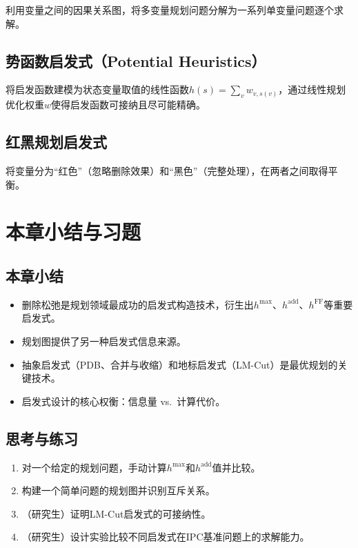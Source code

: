 利用变量之间的因果关系图，将多变量规划问题分解为一系列单变量问题逐个求解。

\subsection{势函数启发式（Potential Heuristics）}

将启发函数建模为状态变量取值的线性函数$h(s) = \sum_v w_{v,s(v)}$，通过线性规划优化权重$w$使得启发函数可接纳且尽可能精确。

\subsection{红黑规划启发式}

将变量分为``红色''（忽略删除效果）和``黑色''（完整处理），在两者之间取得平衡。

\section{本章小结与习题}

\subsection*{本章小结}
\begin{itemize}
  \item 删除松弛是规划领域最成功的启发式构造技术，衍生出$h^{\max}$、$h^{\mathrm{add}}$、$h^{\mathrm{FF}}$等重要启发式。
  \item 规划图提供了另一种启发式信息来源。
  \item 抽象启发式（PDB、合并与收缩）和地标启发式（LM-Cut）是最优规划的关键技术。
  \item 启发式设计的核心权衡：信息量 vs.\ 计算代价。
\end{itemize}

\subsection*{思考与练习}
\begin{enumerate}
  \item 对一个给定的规划问题，手动计算$h^{\max}$和$h^{\mathrm{add}}$值并比较。
  \item 构建一个简单问题的规划图并识别互斥关系。
  \item （研究生）证明LM-Cut启发式的可接纳性。
  \item （研究生）设计实验比较不同启发式在IPC基准问题上的求解能力。
\end{enumerate}

